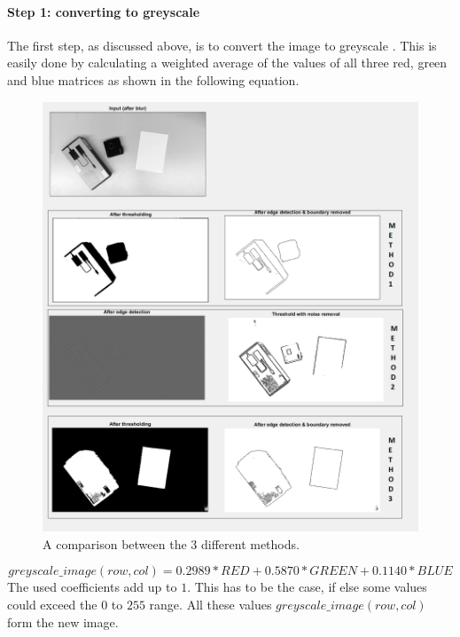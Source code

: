 \documentclass{article}
\begin{document}
\paragraph{Step 1: converting to greyscale}
The first step, as discussed above, is to convert the image to greyscale \cite{greyscale}. This is easily done by calculating a weighted average of the values of all three red, green and blue matrices as shown in the following equation.
\begin{figure}[h]
\center
\includegraphics[width=0.7\linewidth]{comparison_methods.png}
\caption{A comparison between the 3 different methods.}
\label{fig:comparison_methods}
\end{figure}
\begin{equation}
greyscale\_image(row, col) = 0.2989 * RED + 0.5870 * GREEN + 0.1140 * BLUE
\end{equation}
The used coefficients add up to $1$. This has to be the case, if else some values could exceed the $0$ to $255$ range. All these values $greyscale\_image(row, col)$ form the new image.
\end{document}

